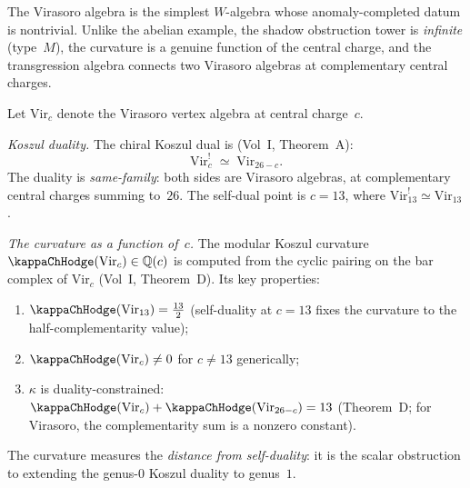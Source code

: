The Virasoro algebra is the simplest $W$-algebra whose
anomaly-completed datum is nontrivial. Unlike the abelian
example, the shadow obstruction tower is \emph{infinite} (type~$M$), the
curvature is a genuine function of the central charge, and
the transgression algebra connects two Virasoro algebras at
complementary central charges.

\begin{computation}
Let $\mathrm{Vir}_c$ denote the Virasoro vertex algebra at
central charge~$c$.

\emph{Koszul duality.}
The chiral Koszul dual is
(Vol~I, Theorem~A):
\begin{equation}%
\mathrm{Vir}_c^!
\;\simeq\;
\mathrm{Vir}_{26-c}.
\end{equation}
The duality is \emph{same-family}: both sides are Virasoro
algebras, at complementary central charges summing to~$26$.
The self-dual point is $c=13$, where
$\mathrm{Vir}_{13}^!\simeq\mathrm{Vir}_{13}$.

\emph{The curvature as a function of~$c$.}
The modular Koszul curvature $\kappaChHodge(\mathrm{Vir}_c)\in\mathbb Q(c)$
is computed from the cyclic pairing on the bar complex of
$\mathrm{Vir}_c$ (Vol~I, Theorem~D). Its key properties:
\begin{enumerate}[label=\textup{(\roman*)}]
\item $\kappaChHodge(\mathrm{Vir}_{13})=\tfrac{13}{2}$ (self-duality
 at $c=13$ fixes the curvature to the half-complementarity value);
\item $\kappaChHodge(\mathrm{Vir}_c)\neq 0$ for $c\neq 13$
 generically;
\item $\kappa$ is duality-constrained:
 $\kappaChHodge(\mathrm{Vir}_c)+\kappaChHodge(\mathrm{Vir}_{26-c})=13$
 (Theorem~D; for Virasoro, the complementarity sum is a nonzero constant).
\end{enumerate}
The curvature measures the \emph{distance from self-duality}:
it is the scalar obstruction to extending the genus-$0$
Koszul duality to genus~$1$.


\end{computation}
